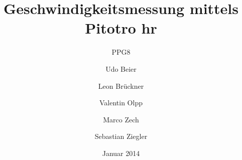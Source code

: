 
%



\title{Geschwindigkeitsmessung mittels Pitotro hr}
\subtitle{PPG8}
\date{Januar 2014}
\author{Udo Beier \and Leon Brückner \and Valentin Olpp \and Marco Zech \and Sebastian Ziegler}
\maketitle
\tableofcontents
\newpage
\listoffigures
\listoftables
\newpage






\newpage
%
%


